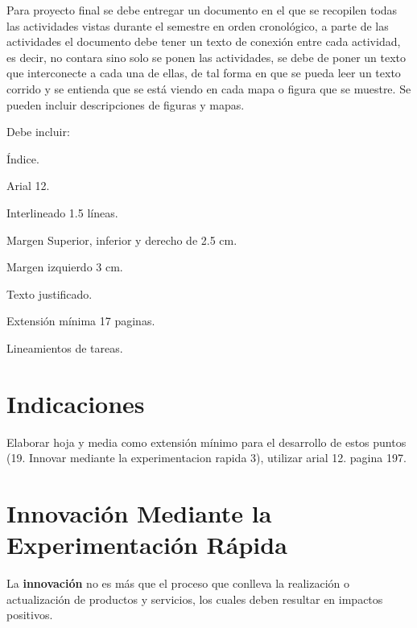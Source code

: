 


\clearpage
\vspace*{-16pt}
\begin{center}
	{\textbf{\huge \theTitle}}
\end{center}
\vspace*{8pt}


Para proyecto final se debe entregar un documento en el que se recopilen
todas las actividades vistas durante el semestre en orden cronológico, a parte
de las actividades el documento debe tener un texto de conexión entre cada
actividad, es decir, no contara sino solo se ponen las actividades, se debe de
poner un texto que interconecte a cada una de ellas, de tal forma en que se
pueda leer un texto corrido y se entienda que se está viendo en cada mapa o
figura que se muestre. Se pueden incluir descripciones de figuras y mapas.

Debe incluir:


Índice.

Arial 12.

Interlineado 1.5 líneas.


Margen Superior, inferior y derecho de 2.5 cm.


Margen izquierdo 3 cm.

Texto justificado.

Extensión mínima 17 paginas.


Lineamientos de tareas.

\section*{Indicaciones}

Elaborar hoja y media como extensión mínimo para el desarrollo de estos puntos
(19. Innovar mediante la experimentacion rapida 3), utilizar arial 12. pagina
197.

\clearpage
\section{Innovación Mediante la Experimentación Rápida}

La \textbf{innovación} no es más que el proceso que conlleva la realización
o actualización de productos y servicios, los cuales deben resultar en impactos
positivos.

